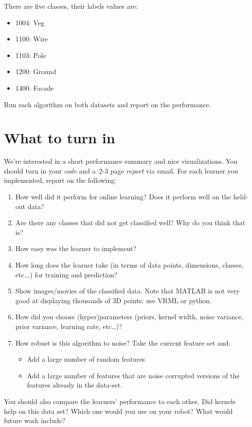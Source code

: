 \documentclass[letterpaper]{article}
\begin{document}
There are five classes, their labels values are:
\begin{itemize}
\item 1004: Veg
\item 1100: Wire
\item 1103: Pole
\item 1200: Ground
\item 1400: Facade
\end{itemize}

Run each algorithm on both datasets and report on the performance.

\section*{What to turn in}

We're interested in a short performance summary and nice visualizations.  You should turn in your \emph{code} and a~2-3 page \emph{report} via email.  For each learner you implemented, report on the following:
\begin{enumerate}
\item How well did it perform for online learning?  Does it perform well on the held-out data?
\item Are there any classes that did not get classified well?  Why do you think that is?
\item How easy was the learner to implement?
\item How long does the learner take (in terms of data points, dimensions, classes, etc...) for training and prediction?
\item Show images/movies of the classified data.  Note that MATLAB is not very good at displaying thousands of 3D points; use VRML or python.
\item How did you choose (hyper)parameters (priors, kernel width, noise variance, prior variance, learning rate, etc\ldots)?
\item How robust is this algorithm to noise? Take the current feature set and:
  \begin{itemize}
  \item Add a large number of random features
  \item Add a large number of features that are noise corrupted versions of the features already in the data-set.
  \end{itemize}

\end{enumerate}

You should also compare the learners' performance to each other.  Did kernels help on this data set?  Which one would you use on your robot?  What would future work include?
\end{document}
